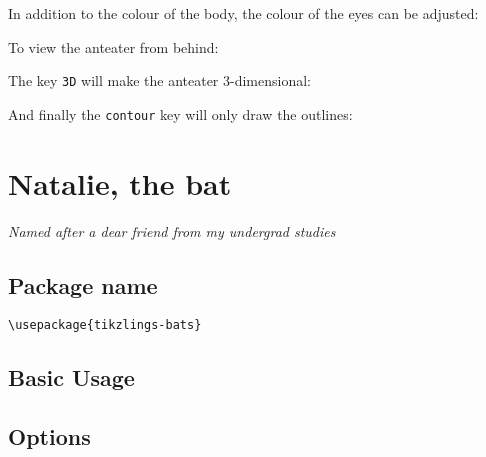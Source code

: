 \documentclass[parskip=half]{scrartcl}
\begin{document}
In addition to the colour of the body, the colour of the eyes can be adjusted:
\begin{tcblisting}{}
\anteater[eye=red]
\end{tcblisting}

To view the anteater from behind:
\begin{tcblisting}{}
\anteater[back]
\end{tcblisting}

The key \lstinline|3D| will make the anteater 3-dimensional:
\begin{tcblisting}{}
\anteater[3D]
\end{tcblisting}

And finally the \lstinline|contour| key will only draw the outlines:
\begin{tcblisting}{}
\anteater[contour=black]
\end{tcblisting}

%
%
\clearpage
\section[Bat]{Natalie, the bat}

\emph{Named after a dear friend from my undergrad studies}

\subsection{Package name}

\begin{tcolorbox}[lower separated=false, lefthand width=.8\linewidth]
\vspace*{0.5cm}
\lstinline|\usepackage{tikzlings-bats}| 
\vspace*{0.5cm}
\end{tcolorbox}

\subsection{Basic Usage}

\begin{tcblisting}{}
\bat
\end{tcblisting}

\subsection{Options}
\end{document}

